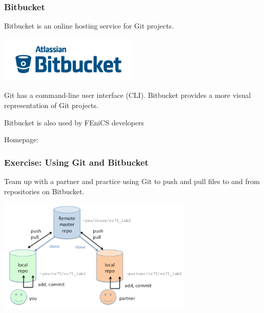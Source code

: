 \documentclass{fenicscourse}
\begin{document}
\begin{frame}
  \frametitle{Bitbucket}

  Bitbucket is an online hosting service for Git projects.

  \begin{center}
    \includegraphics[width=0.5\textwidth]{png/bitbucket_logo.png}
  \end{center}

  Git has a command-line user interface (CLI). Bitbucket provides a
  more visual representation of Git projects.

  \bigskip

  Bitbucket is also used by FEniCS developers 

  \bigskip

  Homepage: 
\end{frame}

\begin{frame}
  \frametitle{Exercise: Using Git and Bitbucket}

  Team up with a partner and practice using Git to push and pull files
  to and from repositories on Bitbucket.

  \bigskip

  \begin{center}
    \includegraphics[width=0.7\textwidth]{png/git_repos.png}
  \end{center}
\end{frame}
\end{document}
